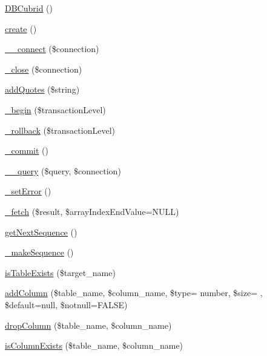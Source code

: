 \begin{DoxyCompactItemize}
\item 
\hyperlink{classDBCubrid_ad17912f5a76c00f761e32178f634581e}{D\+B\+Cubrid} ()
\item 
\hyperlink{classDBCubrid_a9a5f425a0abce46d33a6d713b7dd407f}{create} ()
\item 
\hyperlink{classDBCubrid_aa0798dadf20548b2c38e925f391c72f2}{\+\_\+\+\_\+connect} (\$connection)
\item 
\hyperlink{classDBCubrid_ab1a7b718fc864d7b5992cd99abfe2690}{\+\_\+close} (\$connection)
\item 
\hyperlink{classDBCubrid_ab9aea745152a86b3852101aa3225f26d}{add\+Quotes} (\$string)
\item 
\hyperlink{classDBCubrid_a9d1c4b0ff2003c9e1ef843fbb238616d}{\+\_\+begin} (\$transaction\+Level)
\item 
\hyperlink{classDBCubrid_affb82895449542c9375e12cc0558a2cd}{\+\_\+rollback} (\$transaction\+Level)
\item 
\hyperlink{classDBCubrid_ac8cce69fb6939b2383eb03214ff2522b}{\+\_\+commit} ()
\item 
\hyperlink{classDBCubrid_a2319e8c887147d9596e096088ff67c6a}{\+\_\+\+\_\+query} (\$query, \$connection)
\item 
\hyperlink{classDBCubrid_aaf7dd65f4cdfea9903ab641163058936}{\+\_\+set\+Error} ()
\item 
\hyperlink{classDBCubrid_abb95044521be20a8b2ba105ab623b4d9}{\+\_\+fetch} (\$result, \$array\+Index\+End\+Value=N\+U\+L\+L)
\item 
\hyperlink{classDBCubrid_a56780e480de62dfca8d67c7bccb4791c}{get\+Next\+Sequence} ()
\item 
\hyperlink{classDBCubrid_ac91bfc1859aaeb1a8d7a58e56829d4de}{\+\_\+make\+Sequence} ()
\item 
\hyperlink{classDBCubrid_aa88914b97476deb6c292a44bff2f2f40}{is\+Table\+Exists} (\$target\+\_\+name)
\item 
\hyperlink{classDBCubrid_a10207e248b4aa36b60cf4adacfb44889}{add\+Column} (\$table\+\_\+name, \$column\+\_\+name, \$type= \textquotesingle{}number\textquotesingle{}, \$size= \textquotesingle{}\textquotesingle{}, \$default=null, \$notnull=F\+A\+L\+S\+E)
\item 
\hyperlink{classDBCubrid_ad0b269d73617c6de8b3135ee36ae43d2}{drop\+Column} (\$table\+\_\+name, \$column\+\_\+name)
\item 
\hyperlink{classDBCubrid_a76c8d9dd51a3e64f18b8d1f4da318ac7}{is\+Column\+Exists} (\$table\+\_\+name, \$column\+\_\+name)

\end{DoxyCompactItemize}
